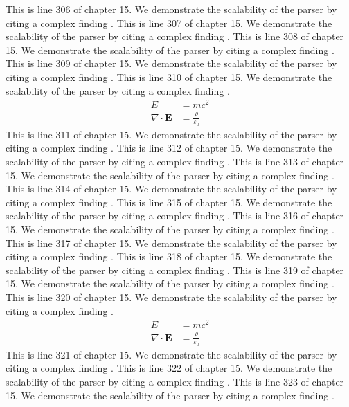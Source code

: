 This is line 306 of chapter 15. We demonstrate the scalability of the parser by citing a complex finding \cite{ref15_306}.
This is line 307 of chapter 15. We demonstrate the scalability of the parser by citing a complex finding \cite{ref15_307}.
This is line 308 of chapter 15. We demonstrate the scalability of the parser by citing a complex finding \cite{ref15_308}.
This is line 309 of chapter 15. We demonstrate the scalability of the parser by citing a complex finding \cite{ref15_309}.
This is line 310 of chapter 15. We demonstrate the scalability of the parser by citing a complex finding \cite{ref15_310}.
\begin{align*}
  E &= mc^2 \\
  \nabla \cdot \mathbf{E} &= \frac{\rho}{\varepsilon_0}
\end{align*}
This is line 311 of chapter 15. We demonstrate the scalability of the parser by citing a complex finding \cite{ref15_311}.
This is line 312 of chapter 15. We demonstrate the scalability of the parser by citing a complex finding \cite{ref15_312}.
This is line 313 of chapter 15. We demonstrate the scalability of the parser by citing a complex finding \cite{ref15_313}.
This is line 314 of chapter 15. We demonstrate the scalability of the parser by citing a complex finding \cite{ref15_314}.
This is line 315 of chapter 15. We demonstrate the scalability of the parser by citing a complex finding \cite{ref15_315}.
This is line 316 of chapter 15. We demonstrate the scalability of the parser by citing a complex finding \cite{ref15_316}.
This is line 317 of chapter 15. We demonstrate the scalability of the parser by citing a complex finding \cite{ref15_317}.
This is line 318 of chapter 15. We demonstrate the scalability of the parser by citing a complex finding \cite{ref15_318}.
This is line 319 of chapter 15. We demonstrate the scalability of the parser by citing a complex finding \cite{ref15_319}.
This is line 320 of chapter 15. We demonstrate the scalability of the parser by citing a complex finding \cite{ref15_320}.
\begin{align*}
  E &= mc^2 \\
  \nabla \cdot \mathbf{E} &= \frac{\rho}{\varepsilon_0}
\end{align*}
This is line 321 of chapter 15. We demonstrate the scalability of the parser by citing a complex finding \cite{ref15_321}.
This is line 322 of chapter 15. We demonstrate the scalability of the parser by citing a complex finding \cite{ref15_322}.
This is line 323 of chapter 15. We demonstrate the scalability of the parser by citing a complex finding \cite{ref15_323}.
